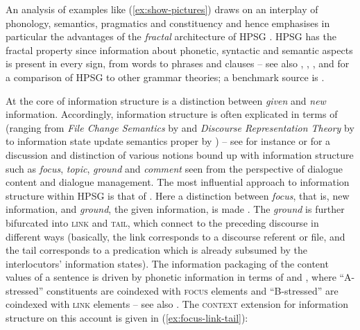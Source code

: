 \documentclass[output=paper
 	        ,biblatex
                ,babelshorthands
                ,newtxmath
                ,draftmode
                ,colorlinks, citecolor=brown
]{langscibook}
\begin{document}
An analysis of examples like (\ref{ex:show-pictures}) draws on an interplay of phonology, semantics, pragmatics and constituency and hence emphasises in particular the advantages of the \emph{fractal} architecture of HPSG \citep{Johnson:Lappin:1999}. 
%
HPSG has the fractal property since
information about phonetic, syntactic and semantic aspects is present in every sign, from words to phrases and clauses \citep[]{Pollard:1997} -- see also , , ,  and  for a comparison of HPSG to other grammar theories; a benchmark source is \citet{MuellerGT-Eng1}.


 
At the core of information structure is a distinction between \emph{given} and \emph{new} information. 
%
Accordingly, information structure is often explicated in terms of  (ranging from \emph{File Change Semantics}  by \citealt{Heim:2002} and \emph{Discourse Representation Theory}  by \citealt{Kamp:Reyle:1993} to information state update semantics proper by \citealt{Traum:Larsson:2003}) -- see for instance \citet{Krifka:2008} or \citet{Vallduv`i2015} for a discussion and distinction of various notions bound up with information structure such as \emph{focus},  \emph{topic},  \emph{ground}  and \emph{comment}  seen from the perspective of dialogue content and dialogue management.
%
The most influential approach to information structure within HPSG is that of \citet{Engdahl:Vallduvi:1996}.
%
Here a distinction between \emph{focus}, that is, new information, and \emph{ground}, the given information, is made \citep[]{Engdahl:Vallduvi:1996}. 
%
The \emph{ground} is further bifurcated into \textsc{link} and \textsc{tail}, which connect to the preceding discourse in different ways (basically, the link corresponds to a discourse referent or file, and the tail corresponds to a predication which is already subsumed by the interlocutors' information states).
%
The information packaging of the content values of a sentence is driven by phonetic information in terms of  and  \citep[Chapter 6]{Jackendoff:1972}, where \enquote{A-stressed} constituents are coindexed with \textsc{focus} elements and \enquote{B-stressed} are coindexed with \textsc{link} elements -- see also .
%
The \textsc{context} extension for information structure on this account is given in (\ref{ex:focus-link-tail}):
%
\ea \label{ex:focus-link-tail}
\z
\end{document}

